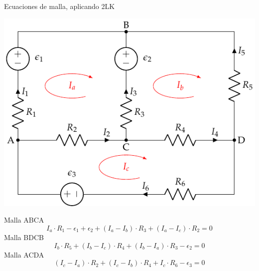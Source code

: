 \documentclass[aspectratio=169, xcolor={usenames,svgnames,dvipsnames}]{beamer}
\begin{document}
\begin{frame}{Ecuaciones de malla, \hspace{3mm}aplicando 2LK}
    \begin{center}
    \includegraphics[height=0.45\textheight]{../figs/mallas1_corrientes.pdf}
    \end{center}
    
    Malla ABCA
    \begin{equation*}
      I_a \cdot R_1 - \epsilon_1 + \epsilon_2 + (I_a - I_b) \cdot R_3 + (I_a - I_c) \cdot R_2 = 0
    \end{equation*}
    Malla BDCB
    \begin{equation*}
      I_b \cdot R_5 + (I_b - I_c) \cdot R_4 + (I_b - I_a) \cdot R_3 - \epsilon_2 = 0
    \end{equation*}
    Malla ACDA
    \begin{equation*}
      (I_c - I_a) \cdot R_2 + (I_c - I_b) \cdot R_4 + I_c \cdot R_6 - \epsilon_3 = 0
    \end{equation*}
\end{frame}

\end{document}
